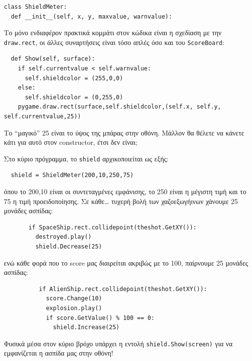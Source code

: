 \begin{verbatim}
class ShieldMeter:
  def __init__(self, x, y, maxvalue, warnvalue):
\end{verbatim}
 
Το μόνο ενδιαφέρον πρακτικά κομμάτι στον κώδικα είναι η σχεδίαση με την {\tt draw.rect}, οι άλλες συναρτήσεις είναι τόσο απλές όσο και του {\tt ScoreBoard}:

\begin{verbatim}
  def Show(self, surface):
    if self.currentvalue < self.warnvalue:
      self.shieldcolor = (255,0,0)
    else:
      self.shieldcolor = (0,255,0)
    pygame.draw.rect(surface,self.shieldcolor,(self.x, self.y,  self.currentvalue,25))
\end{verbatim}

Το ``μαγικό'' 25 είναι το ύψος της μπάρας στην οθόνη. Μάλλον θα θέλετε να κάνετε κάτι για αυτό στον constructor, έτσι δεν είναι;

Στο κύριο πρόγραμμα, το {\tt shield} αρχικοποιείται ως εξής:

\begin{verbatim}
  shield = ShieldMeter(200,10,250,75)
\end{verbatim}

όπου το 200,10 είναι οι συντεταγμένες εμφάνισης, το 250 είναι η μέγιστη τιμή και το 75 η τιμή προειδοποίησης. Σε κάθε\ldots{} τυχερή βολή των χαζοεξωγήινων χάνουμε 25 μονάδες ασπίδας:

\begin{verbatim}
       if SpaceShip.rect.collidepoint(theshot.GetXY()):
         destroyed.play()
         shield.Decrease(25)
\end{verbatim}

ενώ κάθε φορά που το score μας διαιρείται ακριβώς με το 100, παίρνουμε 25 μονάδες ασπίδας:

\begin{verbatim}
          if AlienShip.rect.collidepoint(theshot.GetXY()):
            score.Change(10)
            explosion.play()
            if score.GetValue() % 100 == 0:
              shield.Increase(25)
\end{verbatim}
 
Φυσικά μέσα στον κύριο βρόχο υπάρχει η εντολή {\tt shield.Show(screen)} για να εμφανίζεται η ασπίδα μας στην οθόνη!


